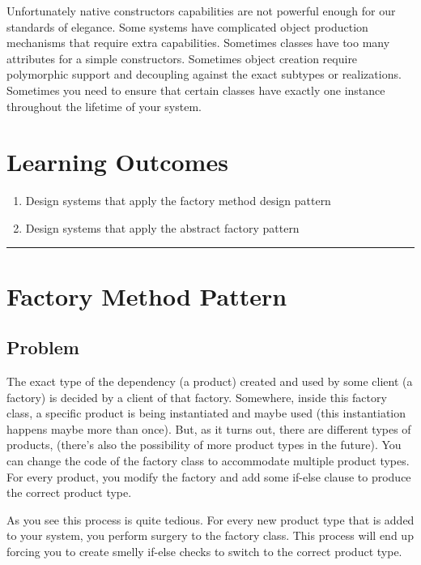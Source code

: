Unfortunately native constructors capabilities are not powerful enough
for our standards of elegance. Some systems have complicated object
production mechanisms that require extra capabilities. Sometimes classes
have too many attributes for a simple constructors. Sometimes object
creation require polymorphic support and decoupling against the exact
subtypes or realizations. Sometimes you need to ensure that certain
classes have exactly one instance throughout the lifetime of your
system.

\section{Learning
Outcomes}\label{creational-patterns.md__learning-outcomes}

\begin{enumerate}
\def\labelenumi{\arabic{enumi}.}
\tightlist
\item
  Design systems that apply the factory method design pattern
\item
  Design systems that apply the abstract factory pattern
\end{enumerate}

\begin{center}\rule{0.5\linewidth}{0.5pt}\end{center}

\section{Factory Method
Pattern}\label{creational-patterns.md__factory-method-pattern}

\subsection{Problem}\label{creational-patterns.md__problem}

The exact type of the dependency (a product) created and used by some
client (a factory) is decided by a client of that factory. Somewhere,
inside this factory class, a specific product is being instantiated and
maybe used (this instantiation happens maybe more than once). But, as it
turns out, there are different types of products, (there's also the
possibility of more product types in the future). You can change the
code of the factory class to accommodate multiple product types. For
every product, you modify the factory and add some if-else clause to
produce the correct product type.

As you see this process is quite tedious. For every new product type
that is added to your system, you perform surgery to the factory class.
This process will end up forcing you to create smelly if-else checks to
switch to the correct product type.


